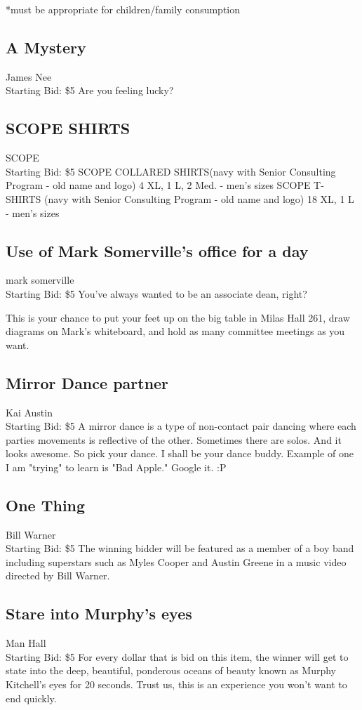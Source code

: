 \documentclass[11pt]{article}
\begin{document}
*must be appropriate for children/family consumption
\subsection{A Mystery}
James Nee
\\
Starting Bid: \$5
\newline
Are you feeling lucky?
\subsection{SCOPE SHIRTS}
SCOPE
\\
Starting Bid: \$5
\newline
SCOPE COLLARED SHIRTS(navy with Senior Consulting Program - old name and logo) 4 XL, 1 L, 2 Med. - men's sizes
SCOPE T-SHIRTS (navy with Senior Consulting Program - old name and logo) 18 XL, 1 L - men's sizes
\subsection{Use of Mark Somerville's office for a day}
mark somerville
\\
Starting Bid: \$5
\newline
You've always wanted to be an associate dean, right?

This is your chance to put your feet up on the big table in Milas Hall 261, draw diagrams on Mark's whiteboard, and hold as many committee meetings as you want.
\subsection{Mirror Dance partner}
Kai Austin
\\
Starting Bid: \$5
\newline
A mirror dance is a type of non-contact pair dancing where each parties movements is reflective of the other. Sometimes there are solos. And it looks awesome. So pick your dance. I shall be your dance buddy.
Example of one I am "trying" to learn is "Bad Apple." Google it. :P
\subsection{One Thing}
Bill Warner
\\
Starting Bid: \$5
\newline
The winning bidder will be featured as a member of a boy band including superstars such as Myles Cooper and Austin Greene in a music video directed by Bill Warner.
\subsection{Stare into Murphy's eyes}
Man Hall
\\
Starting Bid: \$5
\newline
For every dollar that is bid on this item, the winner will get to state into the deep, beautiful, ponderous oceans of beauty known as Murphy Kitchell's eyes for 20 seconds. Trust us, this is an experience you won't want to end quickly.
\end{document}
